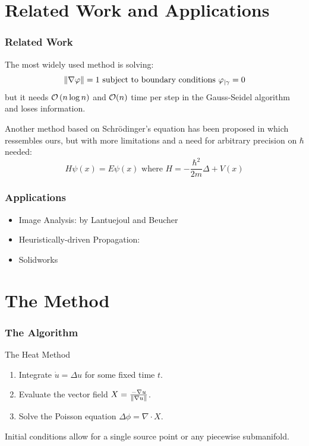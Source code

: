 \documentclass{beamercours}
\begin{document}
\section{Related Work and Applications}
\begin{frame}[allowframebreaks]
	\frametitle{Related Work}
	The most widely used method is solving:
	\begin{equation}
		\left\lVert \nabla \varphi \right\rVert = 1 \text{ subject to boundary conditions } \varphi_{\mid \gamma} = 0
	\end{equation}
	but it needs $\mathcal{O}\left( n\log n \right)$ and $\mathcal{O}(n)$ time per step in the Gauss-Seidel algorithm and loses information.
	\framebreak

	Another method based on Schrödinger's equation has been proposed in \cite{schrod} which ressembles ours, but with more limitations and a need for arbitrary precision on $\hbar$ needed:
	\begin{equation}
		H\psi\left( x \right) = E\psi\left( x \right) \text{ where } H = -\frac{\hbar^{2}}{2m}\Delta + V(x)
	\end{equation}
\end{frame}

\begin{frame}
	\frametitle{Applications}
	\begin{itemize}
		\item Image Analysis: \cite{geodesicmetricuse} by Lantuejoul and Beucher
		\item Heuristically-driven Propagation: \cite{Peyré2009}
		\item Solidworks
	\end{itemize}
\end{frame}

\section{The Method}
\begin{frame}[fragile]
	\frametitle{The Algorithm}
	\begin{algorithm}[H]
		\caption{The Heat Method}
		\label{heatmethod}
		\begin{enumerate}
			\item Integrate $\dot{u} = \Delta u$ for some fixed time $t$.
			\item Evaluate the vector field $X = \frac{-\nabla u}{\left\lVert \nabla u \right\rVert}$.
			\item Solve the Poisson equation $\Delta \phi = \nabla \cdot X$.
		\end{enumerate}
	\end{algorithm}
	Initial conditions allow for a single source point or any piecewise submanifold.
\end{frame}
\end{document}

